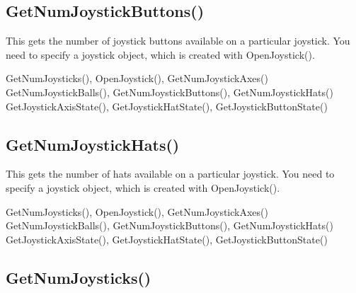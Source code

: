 \documentclass[letterpaper,10pt,english]{sphinxmanual}
\begin{document}
\ignorespaces 

\subsection{GetNumJoystickButtons()}
\label{\detokenize{reference/peblenvironment:getnumjoystickbuttons}}\label{\detokenize{reference/peblenvironment:index-20}}
\sphinxAtStartPar
{}

\sphinxAtStartPar
This gets the number of joystick buttons available on a particular joystick.  You need to specify a joystick object, which is created with OpenJoystick().

\sphinxAtStartPar
{}

\sphinxAtStartPar
GetNumJoysticks(), OpenJoystick(), GetNumJoystickAxes() GetNumJoystickBalls(), GetNumJoystickButtons(), GetNumJoystickHats() GetJoystickAxisState(), GetJoystickHatState(), GetJoystickButtonState()

\ignorespaces 

\subsection{GetNumJoystickHats()}
\label{\detokenize{reference/peblenvironment:getnumjoystickhats}}\label{\detokenize{reference/peblenvironment:index-21}}
\sphinxAtStartPar
{}

\sphinxAtStartPar
{}

\sphinxAtStartPar
This gets the number of hats available on a particular joystick.  You need to specify a joystick object, which is created with OpenJoystick().

\sphinxAtStartPar
{}

\sphinxAtStartPar
GetNumJoysticks(), OpenJoystick(), GetNumJoystickAxes() GetNumJoystickBalls(), GetNumJoystickButtons(), GetNumJoystickHats() GetJoystickAxisState(), GetJoystickHatState(), GetJoystickButtonState()

\ignorespaces 

\subsection{GetNumJoysticks()}
\label{\detokenize{reference/peblenvironment:getnumjoysticks}}\label{\detokenize{reference/peblenvironment:index-22}}
\sphinxAtStartPar
{}
\end{document}
